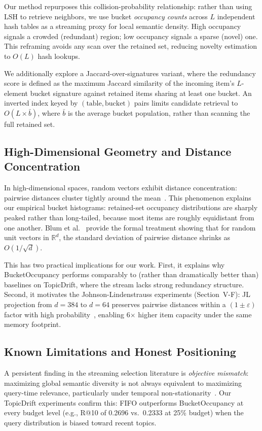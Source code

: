 \documentclass[conference]{IEEEtran}
\begin{document}
Our method repurposes this collision-probability relationship: rather
than using LSH to retrieve neighbors, we use bucket \emph{occupancy
counts} across $L$ independent hash tables as a streaming proxy for
local semantic density. High occupancy signals a crowded (redundant)
region; low occupancy signals a sparse (novel) one. This reframing
avoids any scan over the retained set, reducing novelty estimation to
$O(L)$ hash lookups.

We additionally explore a Jaccard-over-signatures variant, where the
redundancy score is defined as the maximum Jaccard similarity of the
incoming item's $L$-element bucket signature against retained items
sharing at least one bucket. An inverted index keyed by
$(\text{table},\text{bucket})$ pairs limits candidate retrieval to
$O(L \times \bar{b})$, where $\bar{b}$ is the average bucket
population, rather than scanning the full retained set.

\subsection{High-Dimensional Geometry and Distance Concentration}
In high-dimensional spaces, random vectors exhibit distance
concentration: pairwise distances cluster tightly around the
mean~\cite{b15}. This phenomenon explains our empirical bucket
histograms: retained-set occupancy distributions are sharply peaked
rather than long-tailed, because most items are roughly equidistant from
one another. Blum et al.~\cite{b15} provide the formal treatment showing
that for random unit vectors in $\mathbb{R}^d$, the standard deviation
of pairwise distance shrinks as $O(1/\sqrt{d})$.

This has two practical implications for our work. First, it explains why
BucketOccupancy performs comparably to (rather than dramatically better
than) baselines on TopicDrift, where the stream lacks strong redundancy
structure. Second, it motivates the Johnson-Lindenstrauss
experiments (Section~V-F): JL projection from $d{=}384$ to $d{=}64$
preserves pairwise distances within a $(1{\pm}\varepsilon)$ factor with
high probability~\cite{b16}, enabling 6$\times$ higher item capacity
under the same memory footprint.

\subsection{Known Limitations and Honest Positioning}
A persistent finding in the streaming selection literature is
\emph{objective mismatch}: maximizing global semantic diversity is not
always equivalent to maximizing query-time relevance, particularly
under temporal non-stationarity~\cite{b9}. Our TopicDrift experiments
confirm this: FIFO outperforms BucketOccupancy at every budget level
(e.g., R@10 of 0.2696 vs.\ 0.2333 at 25\% budget) when the query
distribution is biased toward recent topics.
\end{document}
